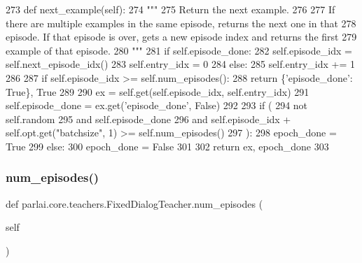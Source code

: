\begin{DoxyCode}
273     \textcolor{keyword}{def }next\_example(self):
274         \textcolor{stringliteral}{"""}
275 \textcolor{stringliteral}{        Return the next example.}
276 \textcolor{stringliteral}{}
277 \textcolor{stringliteral}{        If there are multiple examples in the same episode, returns the next one in that}
278 \textcolor{stringliteral}{        episode. If that episode is over, gets a new episode index and returns the first}
279 \textcolor{stringliteral}{        example of that episode.}
280 \textcolor{stringliteral}{        """}
281         \textcolor{keywordflow}{if} self.episode\_done:
282             self.episode\_idx = self.next\_episode\_idx()
283             self.entry\_idx = 0
284         \textcolor{keywordflow}{else}:
285             self.entry\_idx += 1
286 
287         \textcolor{keywordflow}{if} self.episode\_idx >= self.num\_episodes():
288             \textcolor{keywordflow}{return} \{\textcolor{stringliteral}{'episode\_done'}: \textcolor{keyword}{True}\}, \textcolor{keyword}{True}
289 
290         ex = self.get(self.episode\_idx, self.entry\_idx)
291         self.episode\_done = ex.get(\textcolor{stringliteral}{'episode\_done'}, \textcolor{keyword}{False})
292 
293         \textcolor{keywordflow}{if} (
294             \textcolor{keywordflow}{not} self.random
295             \textcolor{keywordflow}{and} self.episode\_done
296             \textcolor{keywordflow}{and} self.episode\_idx + self.opt.get(\textcolor{stringliteral}{"batchsize"}, 1) >= self.num\_episodes()
297         ):
298             epoch\_done = \textcolor{keyword}{True}
299         \textcolor{keywordflow}{else}:
300             epoch\_done = \textcolor{keyword}{False}
301 
302         \textcolor{keywordflow}{return} ex, epoch\_done
303 
\end{DoxyCode}
\mbox{\label{classparlai_1_1core_1_1teachers_1_1FixedDialogTeacher_a51e3463e7b7b44a6ea8b43fc82aacb75}} 
\subsubsection{\texorpdfstring{num\+\_\+episodes()}{num\_episodes()}}
{\footnotesize\ttfamily def parlai.\+core.\+teachers.\+Fixed\+Dialog\+Teacher.\+num\+\_\+episodes (\begin{DoxyParamCaption}\item[{}]{self }\end{DoxyParamCaption})}

